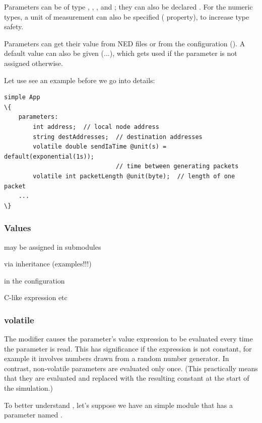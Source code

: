 Parameters can be of type , ,
,  and ; they can also
be declared . For the numeric types, a unit of
measurement can also be specified ( property), to increase
type safety.

Parameters can get their value from NED files or from the configuration
(). A default value can also be given (...\ttt{)}),
which gets used if the parameter is not assigned otherwise.

Let use see an example before we go into details:

\begin{Verbatim}[commandchars=\\\{\}]
simple App
\{
    parameters:
        int address;  // local node address
        string destAddresses;  // destination addresses
        volatile double sendIaTime @unit(s) = default(exponential(1s));
                               // time between generating packets
        volatile int packetLength @unit(byte);  // length of one packet
    ...
\}
\end{Verbatim}

\subsubsection{Values}

may be assigned in submodules

via inheritance  (examples!!!)

in the configuration

C-like expression etc

\subsubsection{volatile}

The  modifier causes the parameter's value expression to
be evaluated every time the parameter is read. This has significance if the
expression is not constant, for example it involves numbers drawn from a
random number generator. In contrast, non-volatile parameters are evaluated
only once. (This practically means that they are evaluated and replaced
with the resulting constant at the start of the simulation.)

To better understand , let's suppose we have an
 simple module that has a  parameter
named .

